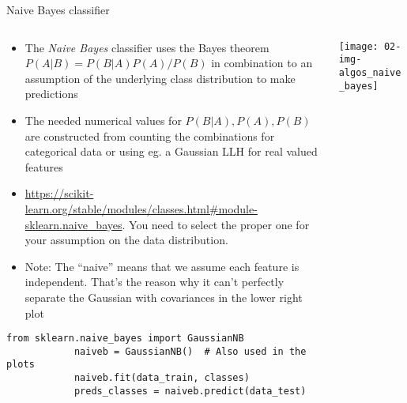   \begin{frame}[fragile]{Naive Bayes classifier}
    \begin{columns}
      \begin{column}{0.65\textwidth}
        \begin{itemize}
          \item The \emph{Naive Bayes} classifier uses the Bayes theorem $P(A|B) = P(B|A)P(A)/P(B)$ in combination to an assumption of the underlying class distribution to make predictions
          \item The needed numerical values for $P(B|A),P(A),P(B)$ are constructed from counting the combinations for categorical data or using eg. a Gaussian LLH for real valued features
          \item \small\url{https://scikit-learn.org/stable/modules/classes.html#module-sklearn.naive_bayes}.
            You need to select the proper one for your assumption on the data distribution.
          \item Note: The \enquote{naive} means that we assume each feature is independent.
            That's the reason why it can't perfectly separate the Gaussian with covariances in the lower right plot
        \end{itemize}
        \begin{mdframed}
          \begin{lstlisting}[style=dark, gobble=10, title=\lsttitlelight{Naive Bayes classification [Note: example shortened]}]
            from sklearn.naive_bayes import GaussianNB
            naiveb = GaussianNB()  # Also used in the plots
            naiveb.fit(data_train, classes)
            preds_classes = naiveb.predict(data_test)
          \end{lstlisting}
        \end{mdframed}
      \end{column}
      \begin{column}{0.35\textwidth}
        \vspace{1em}

        \texttt{[image: 02-img-algos\_naive\_bayes]}
      \end{column}
    \end{columns}
  \end{frame}

